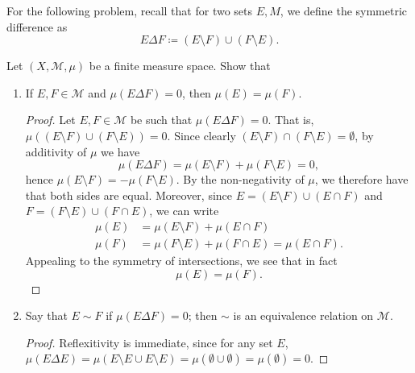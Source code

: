 \documentclass[12pt]{article}
\newenvironment{problem}[2][Problem]{\begin{trivlist}
    \item[\hskip \labelsep {\bfseries #1}\hskip \labelsep {\bfseries #2.}]}{\end{trivlist}}
\theoremstyle{definition}
\begin{document}
For the following problem, recall that for two sets \( E, M \), we define the symmetric difference as
\begin{equation}
	\label{eq:9}
	E \Delta F \coloneq (E \setminus F) \cup (F \setminus E).
\end{equation}

\begin{problem}{1.3.12}
	Let \( (X, \mathcal{M}, \mu) \) be a finite measure space. Show that
	\begin{enumerate}[label=(\alph*)]
		\item If \( E, F \in \mathcal{M} \) and \(\mu(E \Delta F) = 0\), then \(\mu(E) = \mu(F)\).
		      \begin{proof}
			      Let \( E, F \in \mathcal{M} \) be such that \(\mu(E \Delta F) = 0\).
			      That is, \(\mu \left( (E \setminus F) \cup (F \setminus E) \right) = 0\).
			      Since clearly \( (E \setminus F) \cap (F \setminus E) = \emptyset \), by additivity of \(\mu\) we have
			      \begin{equation}
				      \label{eq:10}
				      \mu( E \Delta F ) = \mu(E \setminus F) + \mu(F \setminus E) = 0,
			      \end{equation}
			      hence \( \mu(E \setminus F) = -\mu(F \setminus E) \).
			      By the non-negativity of \(\mu\), we therefore have that both sides are equal.
			      Moreover, since \( E = (E \setminus F) \cup (E \cap F) \) and \( F = (F \setminus E) \cup (F \cap E) \), we can write
			      \begin{align}
				      \label{eq:14}
				      \mu(E) & = \mu(E \setminus F) + \mu(E \cap F)                 \\
				      \mu(F) & = \mu(F \setminus E) + \mu(F \cap E)= \mu(E \cap F).
			      \end{align}
			      Appealing to the symmetry of intersections, we see that in fact
			      \begin{equation}
				      \label{eq:17}
				      \mu(E) = \mu(F).
			      \end{equation}
		      \end{proof}
		\item Say that \( E \sim F \) if \(\mu(E \Delta F) = 0\); then \( \sim \) is an equivalence relation on \( \mathcal{M} \).
		      \begin{proof}
			      Reflexitivity is immediate, since for any set \( E \), \(\mu(E \Delta E) = \mu(E \setminus E \cup E \setminus E) = \mu(\emptyset \cup \emptyset) = \mu(\emptyset) = 0\).


\end{proof}
\end{enumerate}
\end{problem}
\end{document}
